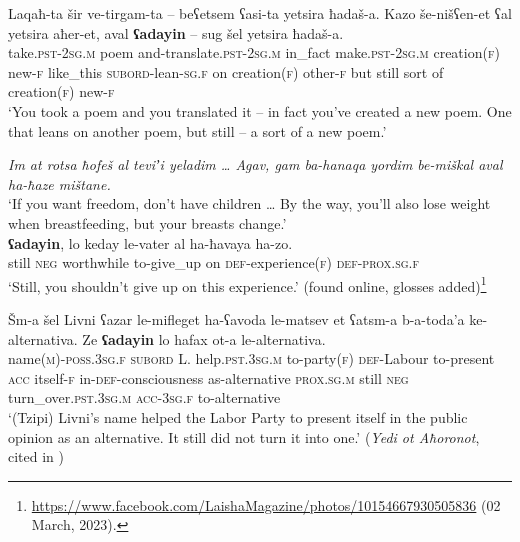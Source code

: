 \begin{exe}
	\ex\label{exAppendixHebrewAdayinConcessiveQ1}
	\gll Laqaħ-ta šir ve-tirgam-ta -- beʕetsem ʕasi-ta yetsira ħadaš-a. Kazo še-nišʕen-et ʕal yetsira aħer-et, aval \textbf{ʕadayin} – sug šel yetsira ħadaš-a.\\
	take.\textsc{pst}-2\textsc{sg}.\textsc{m} poem and-translate.\textsc{pst}-2\textsc{sg}.\textsc{m} {} in\_fact make.\textsc{pst}-2\textsc{sg}.\textsc{m} creation(\textsc{f}) new-\textsc{f} like\_this \textsc{subord}-lean-\textsc{sg}.\textsc{f} on creation(\textsc{f}) other-\textsc{f} but still {} sort of creation(\textsc{f}) new-\textsc{f}\\
	\glt \lq You took a poem and you translated it -- in fact you've created a new poem. One that leans on another poem, but still -- a sort of a new poem.' \parencite[100]{TsirkinSadan2019}
	
	\ex\label{exAppendixHebrewAdayinConcessiveQ2}
	\textit{Im at rotsa ħofeš al teviʼi yeladim … Agav, gam ba-hanaqa yordim be-miškal aval ha-ħaze mištane.}\\
	\lq If you want freedom, don’t have children … By the way, you’ll also lose weight when breastfeeding, but your breasts change.\rq{}\\
	\gll \textbf{ʕadayin}, lo keday le-vater al ha-ħavaya ha-zo.\\
	still \textsc{neg} worthwhile to-give\_up on \textsc{def}-experience(\textsc{f}) \textsc{def}-\textsc{prox}.\textsc{sg}.\textsc{f}\\
	\glt \lq Still, you shouldn’t give up on this experience.\rq{ }(found online, glosses added)\footnote{\url{https://www.facebook.com/LaishaMagazine/photos/10154667930505836} (02 March, 2023).} 
	
	\ex\label{exAppendixHebrewAdayinConcessiveQ3}
	\gll Šm-a šel Livni ʕazar le-mifleget ha-ʕavoda le-matsev et ʕatsm-a b-a-toda\rq{}a ke-alternativa. Ze \textbf{ʕadayin} lo hafax ot-a le-alternativa.\\
	name(\textsc{m})-\textsc{poss}.3\textsc{sg}.\textsc{f} \textsc{subord} L. help.\textsc{pst}.3\textsc{sg}.\textsc{m} to-party(\textsc{f}) \textsc{def}-Labour to-present \textsc{acc} itself-\textsc{f} in-\textsc{def}-consciousness as-alternative \textsc{prox}.\textsc{sg}.\textsc{m} still \textsc{neg} turn\_over.\textsc{pst}.3\textsc{sg}.\textsc{m} \textsc{acc}-3\textsc{sg}.\textsc{f} to-alternative\\
	\glt \lq (Tzipi) Livni's name helped the Labor Party to present itself in the public opinion as an alternative. It still did not turn it into one.' (\textit{Yedi ot Aħoronot}, cited in \cite[100]{TsirkinSadan2019})
\end{exe}

